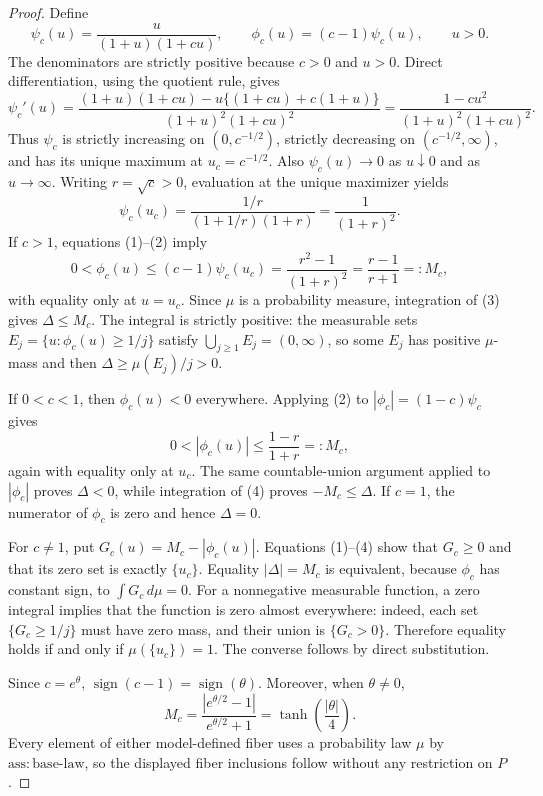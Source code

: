 \documentclass{article}
\begin{document}
\begin{proof}
Define
\[
 \psi_c(u)=\frac{u}{(1+u)(1+cu)},
 \qquad
 \phi_c(u)=(c-1)\psi_c(u),
 \qquad u>0.
\]
The denominators are strictly positive because \(c>0\) and \(u>0\).  Direct differentiation, using the quotient rule, gives
\[
 \psi_c'(u)
 =\frac{(1+u)(1+cu)-u\{(1+cu)+c(1+u)\}}
        {(1+u)^2(1+cu)^2}
 =\frac{1-cu^2}{(1+u)^2(1+cu)^2}. \tag{1}
\]
Thus \(\psi_c\) is strictly increasing on \((0,c^{-1/2})\), strictly decreasing on \((c^{-1/2},\infty)\), and has its unique maximum at \(u_c=c^{-1/2}\).  Also \(\psi_c(u)\to0\) as \(u\downarrow0\) and as \(u\to\infty\).  Writing \(r=\sqrt c>0\), evaluation at the unique maximizer yields
\[
 \psi_c(u_c)
 =\frac{1/r}{(1+1/r)(1+r)}
 =\frac{1}{(1+r)^2}. \tag{2}
\]
If \(c>1\), equations (1)--(2) imply
\[
 0<\phi_c(u)\le(c-1)\psi_c(u_c)
 =\frac{r^2-1}{(1+r)^2}
 =\frac{r-1}{r+1}=:M_c, \tag{3}
\]
with equality only at \(u=u_c\).  Since \(\mu\) is a probability measure, integration of (3) gives \(\Delta\le M_c\).  The integral is strictly positive: the measurable sets
\(E_j=\{u:\phi_c(u)\ge1/j\}\) satisfy \(\bigcup_{j\ge1}E_j=(0,\infty)\), so some \(E_j\) has positive \(\mu\)-mass and then \(\Delta\ge\mu(E_j)/j>0\).

If \(0<c<1\), then \(\phi_c(u)<0\) everywhere.  Applying (2) to \(|\phi_c|=(1-c)\psi_c\) gives
\[
 0<|\phi_c(u)|\le\frac{1-r}{1+r}=:M_c, \tag{4}
\]
again with equality only at \(u_c\).  The same countable-union argument applied to \(|\phi_c|\) proves \(\Delta<0\), while integration of (4) proves \(-M_c\le\Delta\).  If \(c=1\), the numerator of \(\phi_c\) is zero and hence \(\Delta=0\).

For \(c\ne1\), put \(G_c(u)=M_c-|\phi_c(u)|\).  Equations (1)--(4) show that \(G_c\ge0\) and that its zero set is exactly \(\{u_c\}\).  Equality \(|\Delta|=M_c\) is equivalent, because \(\phi_c\) has constant sign, to \(\int G_c\,d\mu=0\).  For a nonnegative measurable function, a zero integral implies that the function is zero almost everywhere: indeed, each set \(\{G_c\ge1/j\}\) must have zero mass, and their union is \(\{G_c>0\}\).  Therefore equality holds if and only if \(\mu(\{u_c\})=1\).  The converse follows by direct substitution.

Since \(c=e^\theta\), \(\operatorname{sign}(c-1)=\operatorname{sign}(\theta)\).  Moreover, when \(\theta\ne0\),
\[
 M_c
 =\frac{|e^{\theta/2}-1|}{e^{\theta/2}+1}
 =\tanh\!\left(\frac{|\theta|}{4}\right). \tag{5}
\]
Every element of either model-defined fiber uses a probability law \(\mu\) by \(\mathrm{ass{:}base\text{-}law}\), so the displayed fiber inclusions follow without any restriction on \(P\).


\end{proof}
\end{document}
